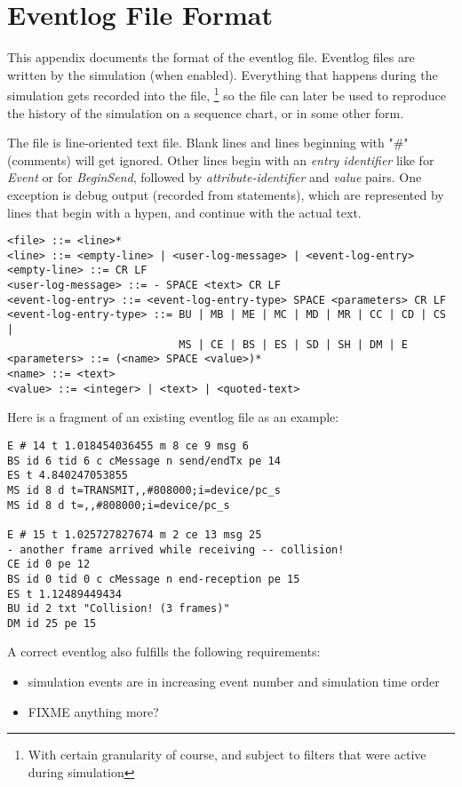 \chapter{Eventlog File Format}
\label{cha:eventlog-file-format}

This appendix documents the format of the eventlog file. Eventlog
files are written by the simulation (when enabled). Everything
that happens during the simulation gets recorded into the file,
  \footnote{With certain granularity of course, and subject to
  filters that were active during simulation}
so the file can later be used to reproduce the history of the
simulation on a sequence chart, or in some other form.

The file is line-oriented text file. Blank lines and lines beginning
with "\#" (comments) will get ignored. Other lines begin with an
\textit{entry identifier} like  for \textit{Event} or
 for \textit{BeginSend}, followed by \textit{attribute-identifier}
and \textit{value} pairs. One exception is debug output
(recorded from  statements), which are represented
by lines that begin with a hypen, and continue with the actual text.

\begin{verbatim}
<file> ::= <line>*
<line> ::= <empty-line> | <user-log-message> | <event-log-entry>
<empty-line> ::= CR LF
<user-log-message> ::= - SPACE <text> CR LF
<event-log-entry> ::= <event-log-entry-type> SPACE <parameters> CR LF
<event-log-entry-type> ::= BU | MB | ME | MC | MD | MR | CC | CD | CS |
                           MS | CE | BS | ES | SD | SH | DM | E
<parameters> ::= (<name> SPACE <value>)*
<name> ::= <text>
<value> ::= <integer> | <text> | <quoted-text>
\end{verbatim}

Here is a fragment of an existing eventlog file as an example:

\begin{verbatim}
E # 14 t 1.018454036455 m 8 ce 9 msg 6
BS id 6 tid 6 c cMessage n send/endTx pe 14
ES t 4.840247053855
MS id 8 d t=TRANSMIT,,#808000;i=device/pc_s
MS id 8 d t=,,#808000;i=device/pc_s

E # 15 t 1.025727827674 m 2 ce 13 msg 25
- another frame arrived while receiving -- collision!
CE id 0 pe 12
BS id 0 tid 0 c cMessage n end-reception pe 15
ES t 1.12489449434
BU id 2 txt "Collision! (3 frames)"
DM id 25 pe 15
\end{verbatim}

A correct eventlog also fulfills the following requirements:
\begin{itemize}
   \item simulation events are in increasing event number and simulation time order
   \item FIXME anything more?
\end{itemize}

